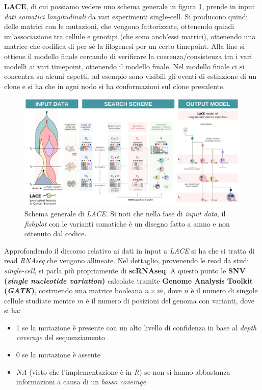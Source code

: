 \documentclass[a4paper,12pt, oneside]{book}
\begin{document}
\textbf{LACE}, di cui possiamo vedere uno schema generale in figura
\ref{fig:lace}, prende in input \textit{dati somatici longitudinali} da vari 
esperimenti single-cell. Si producono quindi delle matrici con le mutazioni, che
vengono fattorizzate, ottenendo quindi un'associazione tra cellule e genotipi
(che sono anch'essi matrici), ottenendo una matrice che codifica di per sé la
filogenesi per un certo timepoint. Alla fine si ottiene il modello finale
cercando di verificare la coerenza/consistenza tra i vari modelli ai vari
timepoint, ottenendo il modello finale. Nel modello finale ci si concentra su
alcuni aspetti, ad esempio sono visibili gli eventi di estinzione di un clone e
si ha che in ogni nodo si ha conformazioni sul clone prevalente.\\
\begin{figure}
  \centering
  \includegraphics[scale = 0.18]{img/lace.jpg}
  \caption{Schema generale di \textit{LACE}. Si noti che nella fase di
    \textit{input data}, il \textit{fishplot} con le varianti somatiche è un
    disegno fatto a amno e non ottenuto dal codice.}
  \label{fig:lace}
\end{figure}
Approfondendo il discorso relativo ai dati in input a \textit{LACE} si ha che si
tratta di read \textit{RNAseq} che vengono allineate. Nel dettaglio, provenendo
le read da studi \textit{single-cell}, si parla più propriamente di
\textbf{scRNAseq}. A questo punto le 
\textbf{SNV (\textit{single nucleotide variation})} calcolate tramite
\textbf{Genome Analysis Toolkit (\textit{GATK})}, costruendo una matrice
booleana $n\times m$, dove $n$ è il numero di singole cellule studiate mentre
$m$ è il numero di posizioni del genoma con varianti, dove si ha:
\begin{itemize}
  \item 1 se la mutazione è presente con un alto livello di confidenza in base
  al \textit{depth coverage} del sequenziamento
  \item 0 se la mutazione è assente
  \item \textit{NA} (visto che l'implementazione è in \textit{R}) se non si
  hanno abbastanza informazioni a causa di un \textit{basso coverage}
\end{itemize}
\end{document}
